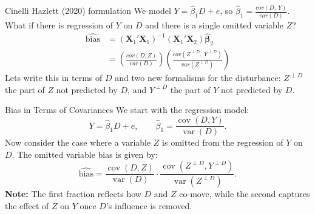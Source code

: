 \documentclass[aspectratio=169, handout, t]{beamer}
\numberwithin{equation}{section}
\begin{document}
\begin{frame}{Cinelli Hazlett (2020) formulation}
We model $Y=\hat{\beta}_1D+e$, so $\hat{\beta}_1=\frac{cov(D,\ Y)}{var(D)}$.\\
\bigskip
What if there is regression of $Y$ on $D$ and there is a single omitted variable $Z$?
\begin{align*}
\widehat{\text{bias}} &= (\bm{X}_1'\bm{X}_1)^{-1}(\bm{X}_1'\bm{X}_2)\bm{\hat{\beta}}_2\\
 &=\left(\frac{cov(D, Z)}{var(D)}\right)\left(\frac{cov(Z^{\perp D},\ Y^{\perp D})}{var(Z^{\perp D})}\right)
 \end{align*}
 Lets write this in terms of $D$ and two new formalisms for the disturbance: $Z^{\perp D}$ the part of $Z$ not predicted by $D$, and $Y^{\perp D}$ the part of $Y$ not predicted by $D$. 
\end{frame}

%

\begin{frame}{Bias in Terms of Covariances}
We start with the regression model:
\[
Y = \hat{\beta}_1 D + e,\qquad \hat{\beta}_1 = \frac{\operatorname{cov}(D,Y)}{\operatorname{var}(D)}.
\]
\vspace{1ex}
Now consider the case where a variable \(Z\) is omitted from the regression of \(Y\) on \(D\).  
The omitted variable bias is given by:
\[
\widehat{\text{bias}} = \frac{\operatorname{cov}(D,Z)}{\operatorname{var}(D)}\cdot\frac{\operatorname{cov}(Z^{\perp D},Y^{\perp D})}{\operatorname{var}(Z^{\perp D})}.
\]
\textbf{Note:}  
The first fraction reflects how \(D\) and \(Z\) co-move, while the second captures the effect of \(Z\) on \(Y\) once \(D\)’s influence is removed.
\end{frame}
\end{document}
